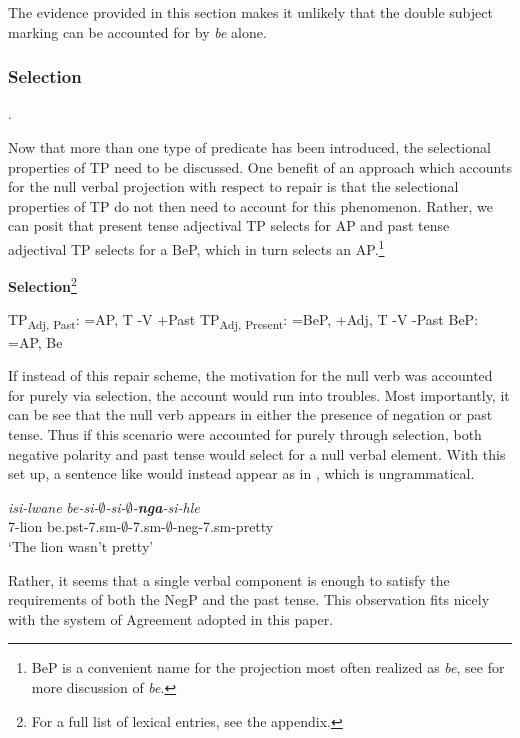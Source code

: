 \documentclass[output=paper]{langsci/langscibook}
\newcommand{\bee}[0]{\textit{be }}
\begin{document}
The evidence provided in this section makes it unlikely that the double subject marking can be accounted for by \bee alone. 



\subsubsection{Selection}. 

Now that more than one type of predicate has been introduced, the selectional properties of TP need to be discussed. One benefit of an approach which accounts for the null verbal projection with respect to repair is that the selectional properties of TP do not then need to account for this phenomenon. Rather, we can posit that present tense adjectival TP selects for AP and past tense adjectival TP selects for a BeP, which in turn selects an AP.\footnote{BeP is a convenient name for the projection most often realized as \textit{be}, see  for more discussion of \textit{be}.}


\textbf{Selection}\footnote{For a full list of lexical entries, see the appendix.}
\begin{exe}
\ex\label{ex:burkholder:20} TP\textsubscript{Adj, Past}: =AP, T -V +Past
\ex\label{ex:burkholder:21} TP\textsubscript{Adj, Present}: =BeP, +Adj, T -V -Past
\ex\label{ex:burkholder:22} BeP: =AP, Be 
\end{exe}

If instead of this repair scheme, the motivation for the null verb was accounted for purely via selection, the account would run into troubles. Most importantly, it can be see that the null verb appears in either the presence of negation or past tense. Thus if this scenario were accounted for purely through selection, both negative polarity and past tense would select for a null verbal element. With this set up, a sentence like  would instead appear as in , which is ungrammatical.

\begin{exe}
\ex\label{ex:burkholder:23} \gll *\textit{isi-lwane} \textit{be-si-$\emptyset$-si-$\emptyset$-{\bf nga}-si-hle}\\
       7-lion be.{\sc pst}-7.{\sc sm}-$\emptyset$-7.{\sc sm}-$\emptyset$-{\sc neg}-7.{\sc sm}-pretty\\
    \glt `The lion wasn't pretty' 
\end{exe}

Rather, it seems that a single verbal component is enough to satisfy the requirements of both the NegP and the past tense. This observation fits nicely with the system of Agreement adopted in this paper.
\end{document}
